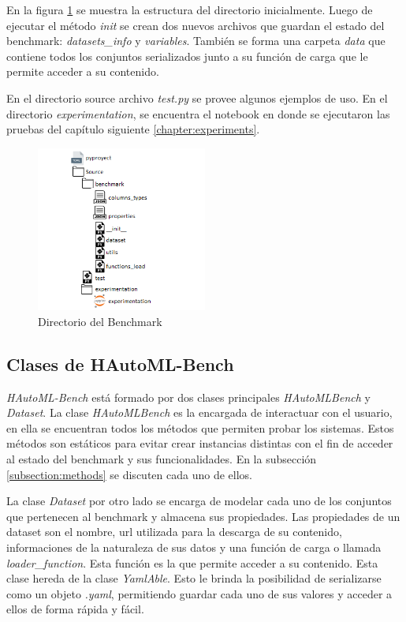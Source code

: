 En la figura \ref{fig:image1} se muestra la estructura del directorio inicialmente. Luego de ejecutar el método \textit{init} se crean dos nuevos archivos que 
guardan el estado del benchmark: \textit{datasets\_info} y \textit{variables}. También se forma una carpeta \textit{data} que contiene todos los conjuntos 
serializados junto a su función de carga que le permite acceder a su contenido.

En el directorio source archivo \textit{test.py} se provee algunos ejemplos de uso. En el directorio \textit{experimentation}, se encuentra el notebook en donde se 
ejecutaron las pruebas del capítulo siguiente \ref{chapter:experiments}.

\begin{figure}
    \centering
    \includegraphics[width=0.5\textwidth]{Graphics/directory.png}
    \caption{Directorio del Benchmark}
    \label{fig:image1}
 \end{figure}

\subsection{Clases de HAutoML-Bench}\label{subsection:class}

\textit{HAutoML-Bench} está formado por dos clases principales  \textit{HAutoMLBench} y \textit{Dataset}.
La clase \textit{HAutoMLBench} es la encargada de interactuar con el usuario, en ella se encuentran todos los 
métodos que permiten probar los sistemas. Estos métodos son estáticos para evitar crear instancias distintas con el fin de acceder
al estado del benchmark y sus funcionalidades. En la subsección \ref{subsection:methods} se discuten cada uno de ellos. 

La clase \textit{Dataset} por otro lado se encarga de modelar cada uno de los conjuntos que pertenecen al benchmark y 
almacena sus propiedades. Las propiedades de un dataset son el nombre, url utilizada para la descarga de su 
contenido, informaciones de la naturaleza de sus datos y una función de carga o llamada 
\textit{loader\_function}. Esta función es la que permite acceder a su contenido. 
Esta clase hereda de la clase \textit{YamlAble}. Esto le brinda la posibilidad  de serializarse como un objeto \textit{.yaml}, 
permitiendo guardar cada uno de sus valores y acceder a ellos de forma rápida y fácil. 

